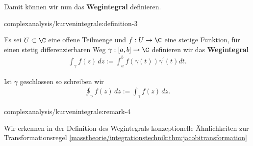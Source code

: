 \documentclass[letterpaper,10pt,german]{jupyterBook}
\begin{document}
\par
Damit können wir nun das \textbf{Wegintegral} definieren.
\begin{definition}{}{complexanalysis/kurvenintegrale:definition-3}



\par
Es sei \(U\subset\C\) eine offene Teilmenge und \(f:U\to\C\) eine stetige Funktion, für einen stetig differenzierbaren Weg \(\gamma:[a,b]\to\C\) definieren wir das \textbf{Wegintegral}
\begin{align*}
\int_\gamma f(z)\, dz := \int_a^b f(\gamma(t))\gamma^\prime(t)dt.
\end{align*}
\par
Ist \(\gamma\) geschlossen so schreiben wir
\begin{align*}
\oint_\gamma f(z)\, dz:=\int_\gamma f(z)\, dz.
\end{align*}\end{definition}
\begin{remark}{}{complexanalysis/kurvenintegrale:remark-4}



\par
Wir erkennen in der Definition des Wegintegrals konzeptionelle Ähnlichkeiten zur Transformationsregel \cref{masstheorie/integrationstechnik:thm:jacobitransformation} 
\end{remark}
\end{document}

